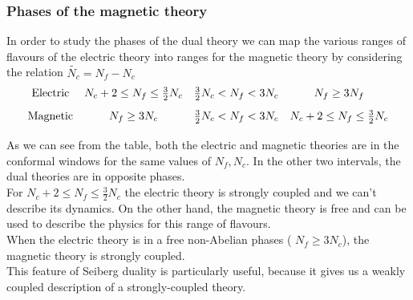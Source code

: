 \subsubsection{Phases of the magnetic theory}
In order to study the phases of the dual theory we can map the various ranges of flavours of the electric theory into ranges for the magnetic theory by considering the relation $\tilde{N_c} = N_f - N_c$
\begin{equation}
\begin{array}{c  c  c  c}
\hbox{Electric} & N_c +2 \leq N_f \leq \frac{3}{2}N_c &  \frac{3}{2}N_c  < N_f < 3 N_c & N_f \geq 3 N_f \\[3mm]
\hbox{Magnetic} & N_f \geq 3 N_c  &  \frac{3}{2}N_c  < N_f < 3 N_c &  N_c +2\leq N_f \leq \frac{3}{2} N_c  \\[2mm]
\end{array}
\end{equation}
As we can see from the table, both the electric and magnetic theories are in the conformal windows for the same values of $N_f,N_c$.
In the other two intervals, the dual theories are in opposite phases.
\\
For $N_c +2 \leq N_f \leq \frac{3}{2} N_c$ the electric theory is strongly coupled and we can't describe its dynamics. 
On the other hand, the magnetic theory is free and can be used to describe the physics for this range of flavours.\\
When the electric theory is in a free non-Abelian phases ( $N_f \geq 3 N_c$), the magnetic theory is strongly coupled.\\
This feature of Seiberg duality is particularly useful, because it gives us a weakly coupled description of a strongly-coupled theory.  





